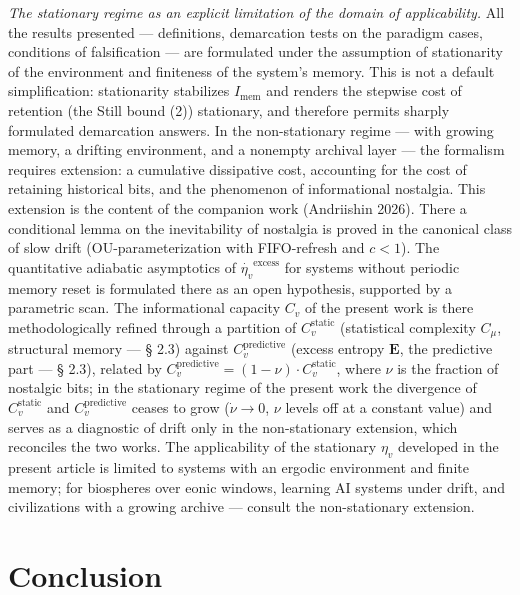 \documentclass[pdflatex,sn-mathphys-ay]{sn-jnl}
\begin{document}
\emph{The stationary regime as an explicit limitation of the domain of applicability.} All the results presented --- definitions, demarcation tests on the paradigm cases, conditions of falsification --- are formulated under the assumption of stationarity of the environment and finiteness of the system's memory. This is not a default simplification: stationarity stabilizes \(I_{\text{mem}}\) and renders the stepwise cost of retention (the Still bound (2)) stationary, and therefore permits sharply formulated demarcation answers. In the non-stationary regime --- with growing memory, a drifting environment, and a nonempty archival layer --- the formalism requires extension: a cumulative dissipative cost, accounting for the cost of retaining historical bits, and the phenomenon of informational nostalgia. This extension is the content of the companion work (Andriishin 2026). There a conditional lemma on the inevitability of nostalgia is proved in the canonical class of slow drift (OU-parameterization with FIFO-refresh and \(c < 1\)). The quantitative adiabatic asymptotics of \(\dot{\eta_v}^{\text{excess}}\) for systems without periodic memory reset is formulated there as an open hypothesis, supported by a parametric scan. The informational capacity \(C_v\) of the present work is there methodologically refined through a partition of \(C_v^{\text{static}}\) (statistical complexity \(C_\mu\), structural memory --- § 2.3) against \(C_v^{\text{predictive}}\) (excess entropy \(\mathbf{E}\), the predictive part --- § 2.3), related by \(C_v^{\text{predictive}} = (1 - \nu) \cdot C_v^{\text{static}}\), where \(\nu\) is the fraction of nostalgic bits; in the stationary regime of the present work the divergence of \(C_v^{\text{static}}\) and \(C_v^{\text{predictive}}\) ceases to grow (\(\dot\nu \to 0\), \(\nu\) levels off at a constant value) and serves as a diagnostic of drift only in the non-stationary extension, which reconciles the two works. The applicability of the stationary \(\eta_v\) developed in the present article is limited to systems with an ergodic environment and finite memory; for biospheres over eonic windows, learning AI systems under drift, and civilizations with a growing archive --- consult the non-stationary extension.

\section{Conclusion}\label{conclusion}
\end{document}
